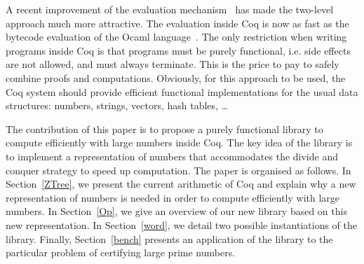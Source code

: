 A recent improvement of the evaluation mechanism~\cite{GreLer} has made the two-level
approach much more attractive.  The evaluation inside {\sc Coq} is now as fast as the bytecode evaluation of
the {\sc Ocaml} language~\cite{Ocaml}. The only restriction when writing programs
inside {\sc Coq} is that programs must be purely functional, i.e. side effects are not allowed,
and must always terminate. This is the price to pay to safely combine proofs
and computations. Obviously, for this approach to be used, 
the {\sc Coq} system should provide efficient functional implementations for the
usual data structures: numbers, strings, vectors, hash tables, \dots 

The contribution of this paper is to propose a purely functional library to compute 
efficiently with large numbers inside {\sc Coq}. The key idea of the library is to 
implement a representation of numbers that accommodates the divide and conquer strategy 
to speed up computation. The paper is organised as follows. In Section~\ref{ZTree}, we present 
the current arithmetic of {\sc Coq} and explain why a new representation of numbers is needed
in order to compute efficiently with large numbers. In Section~\ref{Op}, we give an overview of our new library
based on this new representation.  
In Section~\ref{word}, we detail two possible instantiations of the library.
Finally, Section~\ref{bench} presents an application of the library to the particular
problem of certifying large prime numbers.